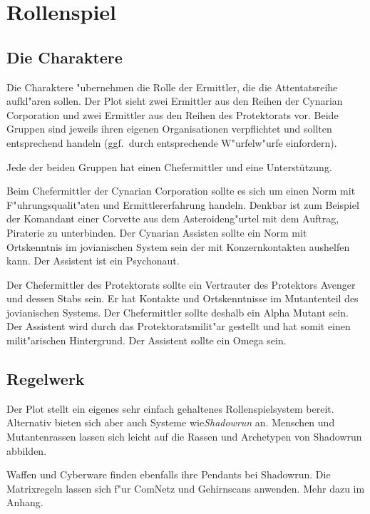 \section{Rollenspiel}

\subsection{Die Charaktere}

Die Charaktere "ubernehmen die Rolle der Ermittler, die die Attentatsreihe aufkl"aren sollen. Der Plot sieht zwei Ermittler aus den Reihen der Cynarian Corporation und zwei Ermittler aus den Reihen des Protektorats vor. Beide Gruppen sind jeweils ihren eigenen Organisationen verpflichtet und sollten entsprechend handeln (ggf.~durch entsprechende W"urfelw"urfe einfordern).

Jede der beiden Gruppen hat einen Chefermittler und eine Unterstützung.

Beim Chefermittler der Cynarian Corporation sollte es sich um einen Norm  mit F"uhrungsqualit"aten und Ermittlererfahrung handeln. Denkbar ist zum Beispiel der Komandant einer Corvette aus dem Asteroideng"urtel mit dem Auftrag, Piraterie zu unterbinden. Der Cynarian Assisten sollte ein Norm mit Ortskenntnis im jovianischen System sein der mit Konzernkontakten aushelfen kann. Der Assistent ist ein Psychonaut. 

Der Chefermittler des Protektorats sollte ein Vertrauter des Protektors Avenger und dessen Stabs sein. Er hat Kontakte und Ortskenntnisse im Mutantenteil des jovianischen Systems. Der Chefermittler sollte deshalb ein Alpha Mutant sein. Der Assistent wird durch das Protektoratsmilit"ar gestellt und hat somit einen milit"arischen Hintergrund. Der Assistent sollte ein Omega sein.

\subsection{Regelwerk}

Der Plot stellt ein eigenes sehr einfach gehaltenes Rollenspielsystem bereit. Alternativ bieten sich aber auch Systeme wie\emph{Shadowrun} an. Menschen und Mutantenrassen lassen sich leicht auf die Rassen und Archetypen von Shadowrun abbilden. 

Waffen und Cyberware finden ebenfalls ihre Pendants bei Shadowrun. Die Matrixregeln lassen sich f"ur ComNetz und Gehirnscans anwenden. Mehr dazu im Anhang.